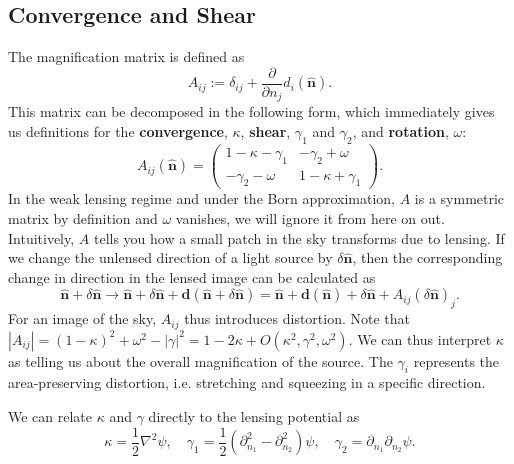 \documentclass[11pt]{article} %
\begin{document}
\subsection{Convergence and Shear}
The magnification matrix is defined as
\begin{equation}
    A_{ij} := \delta_{ij} + \frac{\partial}{\partial n_j}d_i(\hat{\mathbf n}).
\end{equation}
This matrix can be decomposed in the following form, which immediately gives us definitions for the \textbf{convergence}, $\kappa$, \textbf{shear}, $\gamma_1$ and $\gamma_2$, and \textbf{rotation}, $\omega$:
\begin{equation}
    A_{ij}(\hat{\mathbf n}) = \begin{pmatrix}
        1 - \kappa - \gamma_1 & -\gamma_2 + \omega \\
        -\gamma_2 - \omega & 1 - \kappa + \gamma_1
    \end{pmatrix}.
\end{equation}
In the weak lensing regime and under the Born approximation, $A$ is a symmetric matrix by definition and $\omega$ vanishes, we will ignore it from here on out. Intuitively, $A$ tells you how a small patch in the sky transforms due to lensing. If we change the unlensed direction of a light source by $\delta\hat{\mathbf n}$, then the corresponding change in direction in the lensed image can be calculated as
\begin{equation}
\hat{\mathbf{n}} + \delta \hat{\mathbf{n}} \rightarrow \hat{\mathbf{n}} + \delta \hat{\mathbf{n}} + \mathbf d (\hat{\mathbf{n}} + \delta \hat{\mathbf{n}}) = \hat{\mathbf{n}} + \mathbf d (\hat{\mathbf n}) + \delta \hat{\mathbf n} + A_{ij}(\delta \hat{\mathbf{n}})_j.
\end{equation}
For an image of the sky, $A_{ij}$ thus introduces distortion. Note that $|A_{ij}| = (1 - \kappa)^2 + \omega^2 - |\gamma|^2 = 1 - 2\kappa + O(\kappa^2, \gamma^2, \omega^2)$. We can thus interpret $\kappa$ as telling us about the overall magnification of the source. The $\gamma_i$ represents the area-preserving distortion, i.e. stretching and squeezing in a specific direction.

We can relate $\kappa$ and $\gamma$ directly to the lensing potential as
\begin{equation}
    \kappa = \frac{1}{2}\nabla^2\psi, \quad \gamma_1 = \frac{1}{2}(\partial_{n_1}^2 - \partial_{n_2}^2)\psi, \quad \gamma_2 = \partial_{n_1}\partial_{n_2} \psi.
\end{equation}
\end{document}
